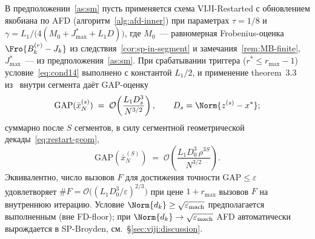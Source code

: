 \begin{theorem}
\label{thm:afd}
В предположении~\ref{as:sm} пусть применяется схема VIJI-Restarted с
обновлением якобиана по AFD (алгоритм~\ref{alg:afd-inner}) при параметрах
$\tau = 1/8$ и $\gamma = L_1/\bigl(4(M_0 + J^{*}_{\max} + L_1 D)\bigr)$,
где $M_0$~--- равномерная Frobenius-оценка $\Fro{B_k^{(r)} - J_k}$ из
следствия~\ref{cor:sp-in-segment} и замечания~\ref{rem:MB-finite},
$J^{*}_{\max}$~--- из предположения~\ref{as:sm}. При срабатывании триггера
($r^{*} \le r_{\max}-1$) условие~\eqref{eq:cond14} выполнено с константой
$L_1/2$, и применение theorem~3.3 из~\cite{Agafonov2024VIJI} внутри
сегмента даёт GAP-оценку
\[
\mathrm{GAP}(\bar x^{(s)}_N) \;=\; \mathcal O\!\left(\frac{L_1 D_s^3}{N^{3/2}}\right),
\qquad D_s = \Norm{z^{(s)} - x^{*}};
\]
суммарно после $S$ сегментов, в силу сегментной геометрической
декады~\eqref{eq:restart-geom},
\[
\mathrm{GAP}(\bar x^{(S)}_N)
\;=\;
\mathcal O\!\left(\frac{L_1 D_0^3 \,\rho^{3 S}}{N^{3/2}}\right).
\]
Эквивалентно, число вызовов $F$ для достижения точности
$\mathrm{GAP} \le \varepsilon$ удовлетворяет
$\#F = \mathcal O\bigl((L_1 D_0^3 / \varepsilon)^{2/3}\bigr)$ при цене
$1 + r_{\max}$ вызовов $F$ на внутреннюю итерацию.
Условие $\Norm{d_k} \ge \sqrt{\varepsilon_{\mathrm{mach}}}$ предполагается
выполненным (вне FD-floor); при $\Norm{d_k} \to \sqrt{\varepsilon_{\mathrm{mach}}}$
AFD автоматически вырождается в SP-Broyden, см.\ \S\ref{sec:viji:discussion}.
\end{theorem}


